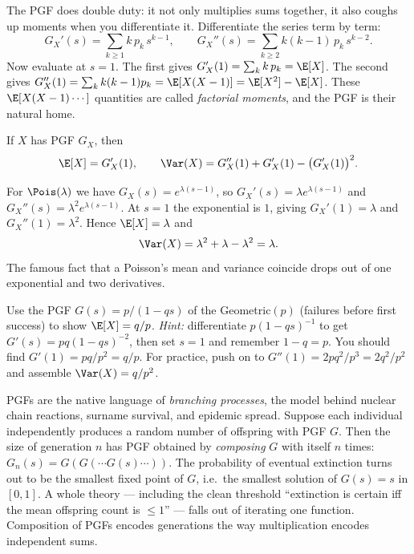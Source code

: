 The PGF does double duty: it not only multiplies sums together, it also coughs
up moments when you differentiate it. Differentiate the series term by term:
\[
  G_X'(s) = \sum_{k\ge 1} k\,p_k\, s^{k-1},
  \qquad
  G_X''(s) = \sum_{k\ge 2} k(k-1)\,p_k\, s^{k-2}.
\]
Now evaluate at $s=1$. The first gives $G_X'(1)=\sum_k k\,p_k = \E[X]$. The
second gives $G_X''(1)=\sum_k k(k-1)p_k = \E[X(X-1)] = \E[X^2]-\E[X]$. These
$\E[X(X-1)\cdots]$ quantities are called \emph{factorial moments}, and the PGF
is their natural home.

\begin{proposition}
\label{ch18:prop-pgf-moments}
If $X$ has PGF $G_X$, then
\[
  \E[X] = G_X'(1),
  \qquad
  \Var(X) = G_X''(1) + G_X'(1) - \big(G_X'(1)\big)^2 .
\]
\end{proposition}

\begin{example}
For $\Pois(\lambda)$ we have $G_X(s)=e^{\lambda(s-1)}$, so $G_X'(s)=\lambda
e^{\lambda(s-1)}$ and $G_X''(s)=\lambda^2 e^{\lambda(s-1)}$. At $s=1$ the
exponential is $1$, giving $G_X'(1)=\lambda$ and $G_X''(1)=\lambda^2$. Hence
$\E[X]=\lambda$ and
\[
  \Var(X) = \lambda^2 + \lambda - \lambda^2 = \lambda .
\]
The famous fact that a Poisson's mean and variance coincide drops out of one
exponential and two derivatives.
\end{example}

\begin{walkbox}
Use the PGF $G(s)=p/(1-qs)$ of the Geometric$(p)$ (failures before first
success) to show $\E[X]=q/p$.
\emph{Hint:} differentiate $p(1-qs)^{-1}$ to get $G'(s)=pq(1-qs)^{-2}$, then set
$s=1$ and remember $1-q=p$. You should find $G'(1)=pq/p^2 = q/p$. For practice,
push on to $G''(1)=2pq^2/p^3 = 2q^2/p^2$ and assemble
$\Var(X)=q/p^2$.
\end{walkbox}

\begin{applicationbox}
PGFs are the native language of \emph{branching processes}, the model behind
nuclear chain reactions, surname survival, and epidemic spread. Suppose each
individual independently produces a random number of offspring with PGF $G$.
Then the size of generation $n$ has PGF obtained by \emph{composing} $G$ with
itself $n$ times: $G_n(s) = G(G(\cdots G(s)\cdots))$. The probability of
eventual extinction turns out to be the smallest fixed point of $G$, i.e.\ the
smallest solution of $G(s)=s$ in $[0,1]$. A whole theory --- including the
clean threshold ``extinction is certain iff the mean offspring count is
$\le 1$'' --- falls out of iterating one function. Composition of PGFs encodes
generations the way multiplication encodes independent sums.
\end{applicationbox}

